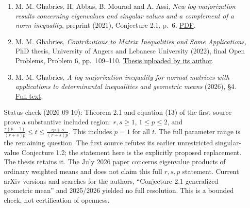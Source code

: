 \documentclass[11pt,a4paper]{article}
\providecommand{\tightlist}{\setlength{\itemsep}{0pt}\setlength{\parskip}{0pt}}
\begin{document}
\begin{enumerate}
\def\labelenumi{\arabic{enumi}.}
\tightlist
\item
  M. M. Ghabries, H. Abbas, B. Mourad and A. Assi, \emph{New
  log-majorization results concerning eigenvalues and singular values
  and a complement of a norm inequality}, preprint (2021), Conjecture
  2.1, p.~6. \href{https://arxiv.org/pdf/2105.13356}{PDF}.
\item
  M. M. Ghabries, \emph{Contributions to Matrix Inequalities and Some
  Applications}, PhD thesis, University of Angers and Lebanese
  University (2022), final Open Problems, Problem 6, pp.~109--110.
  \href{https://www.researchgate.net/publication/361793582_Contributions_to_Matrix_Inequalities_and_Some_Applications}{Thesis
  uploaded by its author}.
\item
  M. M. Ghabries, \emph{A log-majorization inequality for normal
  matrices with applications to determinantal inequalities and geometric
  means} (2026), §4. \href{https://arxiv.org/html/2607.21163}{Full
  text}.
\end{enumerate}

Status check (2026-09-10): Theorem 2.1 and equation (13) of the first
source prove a substantive included region: \(r,s\ge1\), \(1\le p\le2\),
and \(\frac{r(p-1)}{(r+s)p}\le t\le\frac{rp+s}{(r+s)p}\). This includes
\(p=1\) for all \(t\). The full parameter range is the remaining
question. The first source refutes its earlier unrestricted
singular-value Conjecture 1.2; the statement here is the explicitly
proposed replacement. The thesis retains it. The July 2026 paper
concerns eigenvalue products of ordinary weighted means and does not
claim this full \(r,s,p\) statement. Current arXiv versions and searches
for the authors, ``Conjecture 2.1 generalized geometric mean'' and
2025/2026 yielded no full resolution. This is a bounded check, not
certification of openness.
\end{document}
